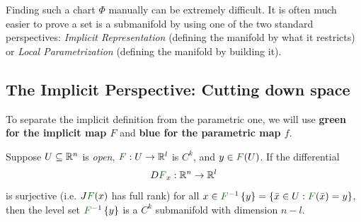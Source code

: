 Finding such a chart $\Phi$ manually can be extremely difficult. It is often much easier to prove a set is a submanifold by using one of the two standard perspectives: \emph{Implicit Representation} (defining the manifold by what it restricts) or \emph{Local Parametrization} (defining the manifold by building it).

\subsection*{The Implicit Perspective: Cutting down space}

To separate the implicit definition from the parametric one, we will use \textcolor{eDarkGreen}{\textbf{green for the implicit map $F$}} and \textcolor{eMediumBlue}{\textbf{blue for the parametric map $f$}}.

\begin{theorem*}
Suppose $U \subseteq \mathbb{R}^n$ is \emph{open}, $\textcolor{eDarkGreen}{F}: U \to \R^l$ is $C^k$, and $y \in \textcolor{eDarkGreen}{F}(U)$. If the differential
\[ D\textcolor{eDarkGreen}{F}_x: \R^n \to \R^l \]
is surjective (i.e. $J\textcolor{eDarkGreen}{F}(x)$ has full rank) for all $x \in \textcolor{eDarkGreen}{F}^{-1}\set{y} = \set{\bar{x} \in U : \textcolor{eDarkGreen}{F}(\bar{x}) = y}$, then the level set $\textcolor{eDarkGreen}{F}^{-1}\set{y}$ is a $C^k$ submanifold with dimension $n-l$.
\end{theorem*}


